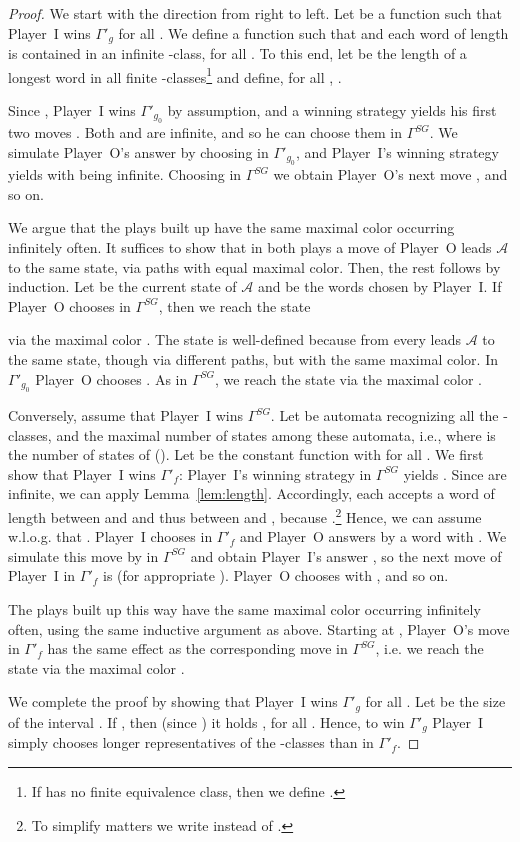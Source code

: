 \documentclass[fleqn,envcountsame]{LMCS}
\newcommand{\aut}[1]{\ensuremath{\mathcal{#1}}}
\newcommand{\pI}{Player~I\xspace}
\newcommand{\pO}{Player~O\xspace}
\newcommand{\GSG}{\ensuremath{\Gamma^{SG}}\xspace}
\newcommand{\Gp}[1]{\ensuremath{\Gamma'_{#1}}\xspace}
\newcommand{\ie}{i.e.\xspace}
\newcommand{\wlofg}{w.l.o.g.\xspace}
\begin{document}
\begin{proof}
We start with the direction from right to left. Let 
be a function such that \pI wins \Gp{g} for all . We
define a function  such that  and each word of
length  is contained in an infinite -class, for all .
To this end, let  be the length of a longest word in all finite
-classes\footnote{If  has no finite
equivalence class, then we define .} and define, for all ,
.

Since , \pI wins \Gp{g_0} by assumption, and a winning strategy yields his first
two moves . Both  and  are infinite, and so he can
choose them in \GSG. We simulate \pO's answer 
by choosing  in \Gp{g_0}, and \pI's winning strategy yields  with  being
infinite. Choosing  in \GSG we obtain \pO's next move
, and so on.

We argue that the plays built up have the same maximal color occurring
infinitely often. It suffices to show that in both plays a move of \pO
leads \aut{A} to the same state, via paths with equal maximal
color. Then, the rest follows by induction. Let  be the current
state of \aut{A} and  be the words chosen by \pI. If \pO
chooses  in \GSG, then we reach the state

via the maximal color
. The state  is well-defined
because from  every 
leads \aut{A} to the same state, though via different paths, but with the
same maximal color. In \Gp{g_0} \pO chooses . As in \GSG, we reach
the state  via the maximal color
.

Conversely, assume that \pI wins \GSG. Let
 be automata recognizing all the
-classes, and  the maximal number of states among these
automata, \ie , where  is the number of states of  ().
Let  be the constant function with  for all .
We first show that \pI wins \Gp{f}:
\pI's winning strategy in \GSG yields .
Since  are infinite, we can apply Lemma~\ref{lem:length}.
Accordingly, each  accepts a word of length between  and
 and thus between  and , because .\footnote{To simplify matters we write  instead of .}
Hence, we can assume \wlofg that .
\pI chooses  in \Gp{f} and \pO answers by a word  with
. We simulate this move by  in \GSG
and obtain \pI's answer , so the next move of \pI in \Gp{f} is
 (for appropriate ). \pO chooses  with ,
and so on.

The plays built up this way have the same maximal color occurring
infinitely often, using the same inductive argument as above. Starting
at , \pO's move  in \Gp{f} has the same effect as the
corresponding move  in \GSG, \ie we reach
the state  via
the maximal color .

We complete the proof by showing that \pI wins \Gp{g} for all .
Let  be the size of the interval
. If , then (since ) it holds
, for all . Hence, to win \Gp{g} \pI
simply chooses longer representatives of the -classes than in
\Gp{f}.
\end{proof}
\end{document}
